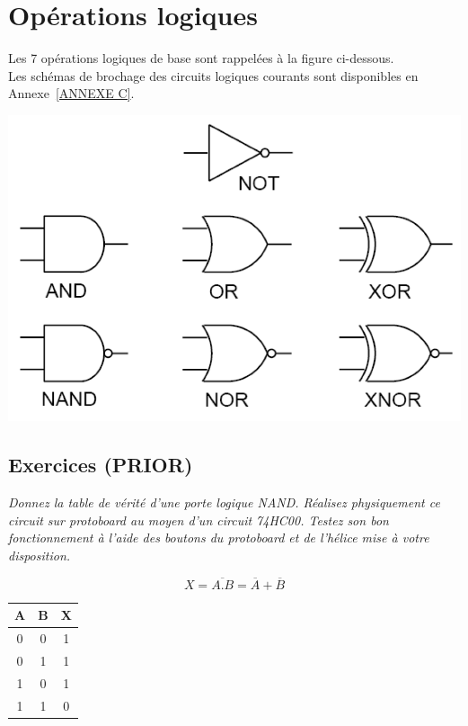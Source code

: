 \section{Opérations logiques}
Les 7 opérations logiques de base sont rappelées à la figure ci-dessous.\\
Les schémas de brochage des circuits logiques courants sont disponibles en Annexe~\ref{ANNEXE C}.
\begin{center}
\includegraphics[scale=0.4]{Labo3_Porteslogiques.png}
\end{center}


\subsection{Exercices (PRIOR)}
{
\textit{Donnez la table de vérité d’une porte logique NAND. Réalisez physiquement ce circuit sur protoboard au moyen d’un circuit 74HC00. Testez son bon fonctionnement à l’aide des boutons du
protoboard et de l’hélice mise à votre disposition.}\\
}
{%
$$X=\overline{A.B}=\overline{A}+\overline{B}$$
\begin{center}
		\begin{tabular}{|c|c|c|}
			\hline
            A&B&X\\
            \hline
            \hline
			0&0&1\\
			0&1&1\\
			1&0&1\\
			1&1&0\\         
			\hline
		\end{tabular}
	\end{center}
}

